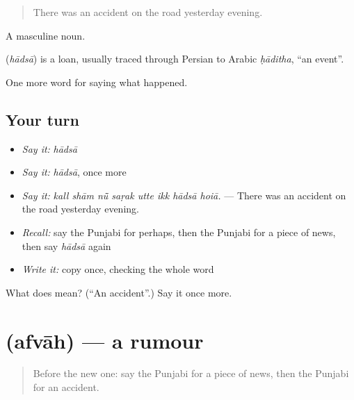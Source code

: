 \begin{quote}
There was an accident on the road yesterday evening.
\end{quote}

A masculine noun.

\begin{cousinweb}
\textbf{} (\emph{hādsā}) is a loan, usually traced through Persian to Arabic \emph{ḥāditha}, \textquotedblleft{}an event\textquotedblright{}.
\end{cousinweb}

\begin{grammarlens}[title={What you've built}]
One more word for saying what happened.
\end{grammarlens}

\subsection*{Your turn}
\begin{itemize}
\raggedright
  \item \emph{Say it:} \emph{hādsā}
  \item \emph{Say it:} \emph{hādsā}, once more
  \item \emph{Say it:} \emph{kall shām nū̃ saṛak utte ikk hādsā hoiā.} — There was an accident on the road yesterday evening.
  \item \emph{Recall:} say the Punjabi for perhaps, then the Punjabi for a piece of news, then say \emph{hādsā} again
  \item \emph{Write it:} copy \textbf{} once, checking the whole word
\end{itemize}

\begin{tcolorbox}[breakable,colback=teal!4,colframe=teal!35!black,title={Before you move on}]
What does  mean? (\textquotedblleft{}An accident\textquotedblright{}.) Say it once more.
\end{tcolorbox}
\section[\texorpdfstring{\pa{ਅਫ਼ਵਾਹ} (afvāh)}{ਅਫ਼ਵਾਹ (afvāh)}]{ (afvāh) — a rumour}

\label{lesson:PA-C309-afvah}



\begin{quote}
Before the new one: say the Punjabi for a piece of news, then the Punjabi for an accident.
\end{quote}

